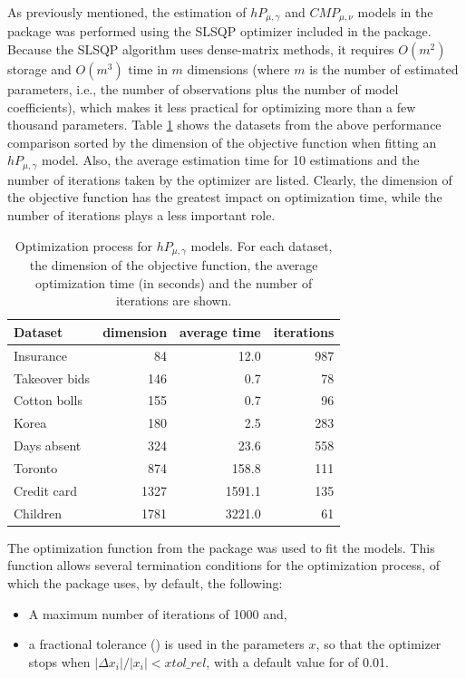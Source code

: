 As previously mentioned, the estimation of $hP_{\mu, \gamma}$ and $CMP_{\mu, \nu}$ models in the  package was performed using the SLSQP optimizer included in the  package. Because the SLSQP algorithm uses dense-matrix methods, it requires $O(m^2)$ storage and $O(m^3)$ time in $m$ dimensions (where $m$ is the number of estimated parameters, i.e., the number of observations plus the number of model coefficients), which makes it less practical for optimizing more than a few thousand parameters. Table \ref{tab_optimization} shows the datasets from the above performance comparison sorted by the dimension of the objective function when fitting an $hP_{\mu, \gamma}$ model. Also, the average estimation time for 10 estimations and the number of iterations taken by the optimizer are listed. Clearly, the dimension of the objective function has the greatest impact on optimization time, while the number of iterations plays a less important role.

\begin{table}[ht]
\centering
\begin{tabular}{lrrr}
\toprule
 Dataset & dimension & average time & iterations \\
  \midrule
  Insurance     &  84  & 12.0   & 987 \\
  Takeover bids & 146  & 0.7    & 78\\
  Cotton bolls  & 155  & 0.7    & 96 \\
  Korea         & 180  & 2.5    & 283 \\
  Days absent   & 324  & 23.6   & 558 \\
  Toronto       & 874  & 158.8  & 111 \\
  Credit card   & 1327 & 1591.1 & 135 \\
  Children      & 1781 & 3221.0 & 61 \\
   \bottomrule
\end{tabular}
\caption{Optimization process for $hP_{\mu, \gamma}$ models. For each dataset, the dimension of the objective function, the average optimization time (in seconds) and the number of iterations are shown.}\label{tab_optimization}
\end{table}

The  optimization function from the  package was used to fit the models. This function allows several termination conditions for the optimization process, of which the  package uses, by default, the following:

\begin{itemize}
    \item A maximum number of iterations of 1000 and,
    \item a fractional tolerance () is used in the parameters $x$, so that the optimizer stops when $|\Delta x_i|/|x_i| < xtol\_rel$, with a default value for  of 0.01.
\end{itemize}


